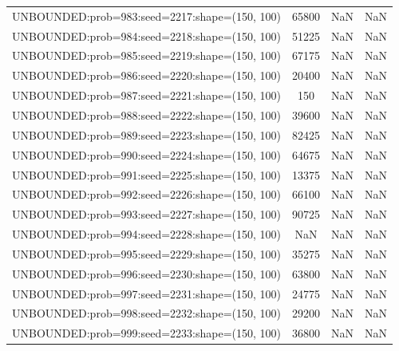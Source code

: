 \begin{longtable}{lccc}
UNBOUNDED:prob=983:seed=2217:shape=(150, 100) & 65800 &   NaN &    NaN \\
UNBOUNDED:prob=984:seed=2218:shape=(150, 100) & 51225 &   NaN &    NaN \\
UNBOUNDED:prob=985:seed=2219:shape=(150, 100) & 67175 &   NaN &    NaN \\
UNBOUNDED:prob=986:seed=2220:shape=(150, 100) & 20400 &   NaN &    NaN \\
UNBOUNDED:prob=987:seed=2221:shape=(150, 100) &   150 &   NaN &    NaN \\
UNBOUNDED:prob=988:seed=2222:shape=(150, 100) & 39600 &   NaN &    NaN \\
UNBOUNDED:prob=989:seed=2223:shape=(150, 100) & 82425 &   NaN &    NaN \\
UNBOUNDED:prob=990:seed=2224:shape=(150, 100) & 64675 &   NaN &    NaN \\
UNBOUNDED:prob=991:seed=2225:shape=(150, 100) & 13375 &   NaN &    NaN \\
UNBOUNDED:prob=992:seed=2226:shape=(150, 100) & 66100 &   NaN &    NaN \\
UNBOUNDED:prob=993:seed=2227:shape=(150, 100) & 90725 &   NaN &    NaN \\
UNBOUNDED:prob=994:seed=2228:shape=(150, 100) &   NaN &   NaN &    NaN \\
UNBOUNDED:prob=995:seed=2229:shape=(150, 100) & 35275 &   NaN &    NaN \\
UNBOUNDED:prob=996:seed=2230:shape=(150, 100) & 63800 &   NaN &    NaN \\
UNBOUNDED:prob=997:seed=2231:shape=(150, 100) & 24775 &   NaN &    NaN \\
UNBOUNDED:prob=998:seed=2232:shape=(150, 100) & 29200 &   NaN &    NaN \\
UNBOUNDED:prob=999:seed=2233:shape=(150, 100) & 36800 &   NaN &    NaN \\
\end{longtable}
